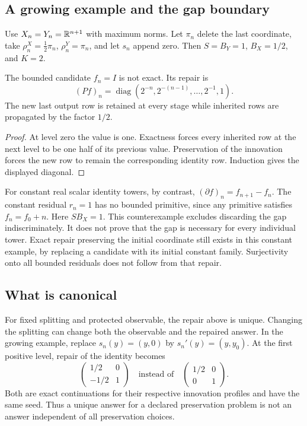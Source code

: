 \subsection{A growing example and the gap boundary}
Use \(X_n=Y_n=\mathbb R^{n+1}\) with maximum norms. Let \(\pi_n\) delete the last coordinate, take \(\rho^X_n=\tfrac12\pi_n\), \(\rho^Y_n=\pi_n\), and let \(s_n\) append zero. Then \(S=B_Y=1\), \(B_X=1/2\), and \(K=2\).

\begin{example}\label{KS22}
The bounded candidate \(f_n=I\) is not exact. Its repair is
\[
 (Pf)_n=\operatorname{diag}(2^{-n},2^{-(n-1)},\ldots,2^{-1},1).
\]
The new last output row is retained at every stage while inherited rows are propagated by the factor \(1/2\).
\end{example}
\begin{proof}
At level zero the value is one. Exactness forces every inherited row at the next level to be one half of its previous value. Preservation of the innovation forces the new row to remain the corresponding identity row. Induction gives the displayed diagonal.
\end{proof}
For constant real scalar identity towers, by contrast, \((\partial f)_n=f_{n+1}-f_n\). The constant residual \(r_n=1\) has no bounded primitive, since any primitive satisfies \(f_n=f_0+n\). Here \(SB_X=1\). This counterexample excludes discarding the gap indiscriminately. It does not prove that the gap is necessary for every individual tower. Exact repair preserving the initial coordinate still exists in this constant example, by replacing a candidate with its initial constant family. Surjectivity onto all bounded residuals does not follow from that repair.

\subsection{What is canonical}
For fixed splitting and protected observable, the repair above is unique. Changing the splitting can change both the observable and the repaired answer. In the growing example, replace \(s_n(y)=(y,0)\) by \(s_n'(y)=(y,y_0)\). At the first positive level, repair of the identity becomes
\[
 \begin{pmatrix}1/2&0\\-1/2&1\end{pmatrix}
 \quad\text{instead of}\quad
 \begin{pmatrix}1/2&0\\0&1\end{pmatrix}.
\]
Both are exact continuations for their respective innovation profiles and have the same seed. Thus a unique answer for a declared preservation problem is not an answer independent of all preservation choices.

